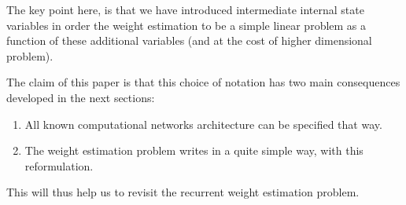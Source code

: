 The key point here, is that we have introduced intermediate internal state variables in order the weight estimation to be a simple linear problem as a function of these additional variables (and at the cost of higher dimensional problem).

The claim of this paper is that this choice of notation has two main consequences developed in the next sections: \begin{enumerate}
\item All known computational networks architecture can be specified that way.
\item The weight estimation problem writes in a quite simple way, with this reformulation.
\end{enumerate}

This will thus help us to revisit the recurrent weight estimation problem.

